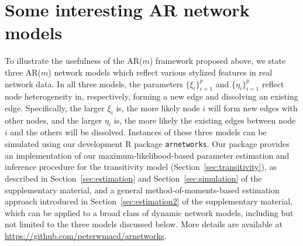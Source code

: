 \documentclass[12pt]{article}
\newcommand{\0}{{\bf 0}}
\begin{document}
\section{Some interesting AR network models} \label{sec:3examples}
\vspace{-0.2cm}
To illustrate the usefulness of the AR($m$) framework proposed above, we state three AR($m$) network models which
reflect various stylized features in real network data.  In all three models, the parameters $\{ \xi_i\}_{i=1}^p$ and
$\{\eta_i\}_{i=1}^p$ reflect node heterogeneity in, respectively, forming a new edge and dissolving an existing edge. Specifically, the larger $\xi_i$ is, the more likely node $i$ will form new edges with other nodes, and the larger $\eta_i$ is, the more likely the existing edges between node $i$ and the others will be dissolved.
Instances of these three models can be simulated using our development R package \texttt{arnetworks}. 
Our package provides an implementation of our maximum-likelihood-based parameter estimation and inference procedure for the transitivity model (Section~\ref{sec:transitivity}), as described in Section~\ref{sec:estimation} and Section~\ref{sec:simulation} of the supplementary material,  and a general method-of-moments-based estimation approach introduced in Section~\ref{sec:estimation2} of the supplementary material, which can be applied to a broad class of dynamic network models, including but not limited to the three models discussed below. More details are available at \url{https://github.com/peterwmacd/arnetworks}.

\vspace{-0.3cm}
\end{document}
